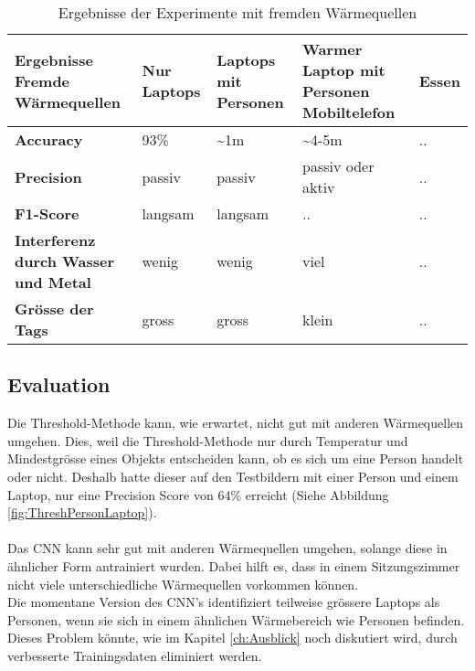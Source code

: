 \begin{table}[H]
	\begin{tabularx}{\textwidth}{|X|X|X|X|X|}
		\hline
		\textbf{Ergebnisse Fremde Wärmequellen} & \textbf{Nur Laptops} & \textbf{Laptops mit Personen} &\textbf{Warmer Laptop mit Personen} \textbf{Mobiltelefon} & \textbf{Essen}\\
		\hline 
		\textbf{Accuracy} & 93\% & \textasciitilde 1m & \textasciitilde 4-5m & ..\\
		\hline  
		\textbf{Precision} & passiv & passiv & passiv oder aktiv & ..\\
		\hline
		\textbf{F1-Score} & langsam & langsam & .. & ..\\
		\hline
		\textbf{Interferenz durch Wasser und Metal} & wenig & wenig & viel & ..\\
		\hline
		\textbf{Grösse der Tags} & gross & gross & klein & ..\\
		\hline
	\end{tabularx}
	\caption{Ergebnisse der Experimente mit fremden Wärmequellen}
	\label{tbl:heatSources}
\end{table}

\subsection{Evaluation}

Die Threshold-Methode kann, wie erwartet, nicht gut mit anderen Wärmequellen umgehen. Dies, weil die Threshold-Methode nur durch Temperatur und Mindestgrösse eines Objekts entscheiden kann, ob es sich um eine Person handelt oder nicht. Deshalb hatte dieser auf den Testbildern mit einer Person und einem Laptop, nur eine Precision Score von 64\% erreicht (Siehe Abbildung \ref{fig:ThreshPersonLaptop}).\\
\\
Das \gls{CNN} kann sehr gut mit anderen Wärmequellen umgehen, solange diese in ähnlicher Form antrainiert wurden. Dabei hilft es, dass in einem Sitzungszimmer nicht viele unterschiedliche Wärmequellen vorkommen können. \\
Die momentane Version des \gls{CNN}'s identifiziert teilweise grössere Laptops als Personen, wenn sie sich in einem ähnlichen Wärmebereich wie Personen befinden. Dieses Problem könnte, wie im Kapitel \ref{ch:Ausblick} noch diskutiert wird, durch verbesserte Trainingsdaten eliminiert werden.

